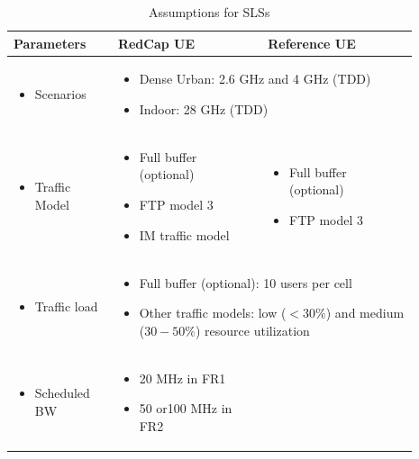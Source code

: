 \documentclass[]{IEEEtran}
\begin{document}
\begin{table}
\centering
\caption{Assumptions for SLSs}
\begin{tabular}{|p{0.23\linewidth}| p{0.33\linewidth} |  p{0.33\linewidth}|} 
 \hline
    \textbf{Parameters}  & \textbf{RedCap UE}  &  \textbf{Reference UE}\\
\hline

\begin{itemize}[leftmargin=0,label={}]
        \item Scenarios
    \end{itemize}  & 
    \multicolumn{2}{|p{0.66\linewidth}|}{
    \begin{itemize}[leftmargin=*]
        \item Dense Urban: 2.6 GHz and 4 GHz (TDD)
        \item Indoor: 28 GHz (TDD)
    \end{itemize} 
    }\\
\hline

    \begin{itemize}[leftmargin=0,label={}]
        \item Traffic Model
    \end{itemize}  & 
    \begin{itemize}[leftmargin=*]
        \item Full buffer (optional)
        \item FTP model 3
        \item IM traffic model
    \end{itemize}   &

    \begin{itemize}[leftmargin=*]
        \item Full buffer (optional)
        \item FTP model 3
    \end{itemize}   \\

\hline
    \begin{itemize}[leftmargin=0,label={}]
        \item Traffic load
    \end{itemize}  & 
    \multicolumn{2}{|p{0.66\linewidth}|}{
    \begin{itemize}[leftmargin=*]
        \item Full buffer (optional): 10 users per cell
        \item Other traffic models: low ($<30\%$) and medium ($30-50\%$) resource utilization
    \end{itemize} 
    }\\
\hline
    \begin{itemize}[leftmargin=0,label={}]
        \item Scheduled BW
    \end{itemize}   & 
    \begin{itemize}[leftmargin=*]
        \item 20 MHz in FR1
        \item 50 or100 MHz in FR2
    \end{itemize}   &
    

\end{tabular}
\end{table}
\end{document}

